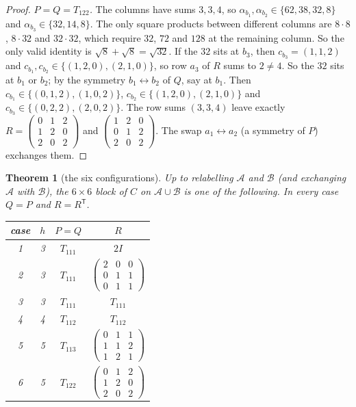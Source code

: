 \documentclass[11pt,a4paper]{amsart}
\newtheorem{theorem}{Theorem}[section]
\theoremstyle{definition}
\theoremstyle{remark}
\newcommand{\cA}{\mathcal{A}}
\newcommand{\cB}{\mathcal{B}}
\begin{document}
\begin{proof}
\emph{$P=Q=T_{122}$.} The columns have sums $3,3,4$, so $\alpha_{b_1},\alpha_{b_2}\in\{62,38,32,8\}$ and
$\alpha_{b_3}\in\{32,14,8\}$. The only square products between different columns are $8\cdot8$,
$8\cdot32$ and $32\cdot32$, which require $32$, $72$ and $128$ at the remaining column. So the only valid
identity is $\sqrt8+\sqrt8=\sqrt{32}$. If the $32$ sits at $b_3$, then $c_{b_3}=(1,1,2)$ and
$c_{b_1},c_{b_2}\in\{(1,2,0),(2,1,0)\}$, so row $a_3$ of $R$ sums to $2\ne4$. So the $32$ sits at $b_1$ or
$b_2$; by the symmetry $b_1\leftrightarrow b_2$ of $Q$, say at $b_1$. Then
$c_{b_1}\in\{(0,1,2),(1,0,2)\}$, $c_{b_2}\in\{(1,2,0),(2,1,0)\}$ and $c_{b_3}\in\{(0,2,2),(2,0,2)\}$. The row
sums $(3,3,4)$ leave exactly $R=\left(\begin{smallmatrix}0&1&2\\1&2&0\\2&0&2\end{smallmatrix}\right)$ and
$\left(\begin{smallmatrix}1&2&0\\0&1&2\\2&0&2\end{smallmatrix}\right)$. The swap $a_1\leftrightarrow a_2$
(a symmetry of $P$) exchanges them.
\end{proof}

\begin{theorem}[the six configurations]\label{thm:six}
Up to relabelling $\cA$ and $\cB$ (and exchanging $\cA$ with $\cB$), the $6\times6$ block of $C$ on
$\cA\cup\cB$ is one of the following. In every case $Q=P$ and $R=R^{\mathsf T}$.
\begin{center}
\renewcommand{\arraystretch}{2.1}
\begin{tabular}{@{}cccc@{}}
\toprule
case & $h$ & $P=Q$ & $R$\\
\midrule
1 & 3 & $T_{111}$ & $2I$\\
2 & 3 & $T_{111}$ & $\left(\begin{smallmatrix}2&0&0\\0&1&1\\0&1&1\end{smallmatrix}\right)$\\
3 & 3 & $T_{111}$ & $T_{111}$\\
4 & 4 & $T_{112}$ & $T_{112}$\\
5 & 5 & $T_{113}$ & $\left(\begin{smallmatrix}0&1&1\\1&1&2\\1&2&1\end{smallmatrix}\right)$\\
6 & 5 & $T_{122}$ & $\left(\begin{smallmatrix}0&1&2\\1&2&0\\2&0&2\end{smallmatrix}\right)$\\
\bottomrule
\end{tabular}
\end{center}
\end{theorem}
\end{document}
